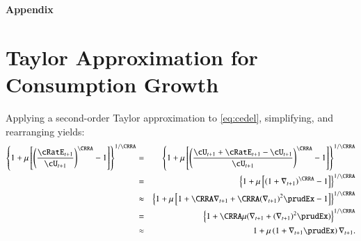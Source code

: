 \centerline{\bf \LARGE Appendix}
\renewcommand{\thesection}{A.\arabic{section}}
\setcounter{section}{0}


\section{Taylor Approximation for Consumption Growth}\label{sec:cGroTaylor}
Applying a second-order Taylor approximation to \eqref{eq:cedel}, simplifying, and rearranging yields:
\begin{eqnarray*}
        \left\{1+\urate\left[\left(\frac{\cRatE_{t+1}}{\cU_{t+1}}\right)^{\CRRA}-1\right]\right\}^{1/\CRRA} & = & \left\{1+\urate\left[\left(\frac{\cU_{t+1}+\cRatE_{t+1}-\cU_{t+1}}{\cU_{t+1}}\right)^{\CRRA}-1\right]\right\}^{1/\CRRA}
\\      & = & \left\{1+\urate\left[\left(1+\nabla _{t+1}\right)^{\CRRA}-1\right]\right\}^{1/\CRRA}
\\      & \approx &      \left\{1+\urate\left[1+\CRRA \nabla _{t+1}+ \CRRA (\nabla _{t+1})^{2}\prudEx-1\right]\right\}^{1/\CRRA}
\\ & = &         \left\{1+ \CRRA \urate (\nabla _{t+1}+ (\nabla _{t+1})^{2}\prudEx)\right\}^{1/\CRRA}
\\ & \approx & 1+ \urate  \left(1+\nabla _{t+1}\prudEx\right)\nabla _{t+1}. \label{eq:cTaylorRaw}
\end{eqnarray*}


